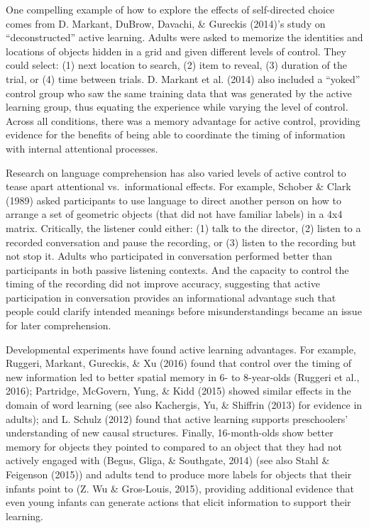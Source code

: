 \documentclass[oneside]{report}
\begin{document}
One compelling example of how to explore the effects of self-directed
choice comes from D. Markant, DuBrow, Davachi, \& Gureckis (2014)'s
study on ``deconstructed'' active learning. Adults were asked to
memorize the identities and locations of objects hidden in a grid and
given different levels of control. They could select: (1) next location
to search, (2) item to reveal, (3) duration of the trial, or (4) time
between trials. D. Markant et al. (2014) also included a ``yoked''
control group who saw the same training data that was generated by the
active learning group, thus equating the experience while varying the
level of control. Across all conditions, there was a memory advantage
for active control, providing evidence for the benefits of being able to
coordinate the timing of information with internal attentional
processes.

Research on language comprehension has also varied levels of active
control to tease apart attentional vs.~informational effects. For
example, Schober \& Clark (1989) asked participants to use language to
direct another person on how to arrange a set of geometric objects (that
did not have familiar labels) in a 4x4 matrix. Critically, the listener
could either: (1) talk to the director, (2) listen to a recorded
conversation and pause the recording, or (3) listen to the recording but
not stop it. Adults who participated in conversation performed better
than participants in both passive listening contexts. And the capacity
to control the timing of the recording did not improve accuracy,
suggesting that active participation in conversation provides an
informational advantage such that people could clarify intended meanings
before misunderstandings became an issue for later comprehension.

Developmental experiments have found active learning advantages. For
example, Ruggeri, Markant, Gureckis, \& Xu (2016) found that control
over the timing of new information led to better spatial memory in 6- to
8-year-olds (Ruggeri et al., 2016); Partridge, McGovern, Yung, \& Kidd
(2015) showed similar effects in the domain of word learning (see also
Kachergis, Yu, \& Shiffrin (2013) for evidence in adults); and L. Schulz
(2012) found that active learning supports preschoolers' understanding
of new causal structures. Finally, 16-month-olds show better memory for
objects they pointed to compared to an object that they had not actively
engaged with (Begus, Gliga, \& Southgate, 2014) (see also Stahl \&
Feigenson (2015)) and adults tend to produce more labels for objects
that their infants point to (Z. Wu \& Gros-Louis, 2015), providing
additional evidence that even young infants can generate actions that
elicit information to support their learning.
\end{document}
